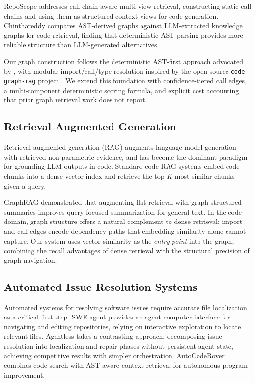 RepoScope \citep{reposcope2025} addresses call chain-aware multi-view retrieval, constructing static call chains and using them as structured context views for code generation. Chinthareddy \citep{reliablegraphrag2026} compares AST-derived graphs against LLM-extracted knowledge graphs for code retrieval, finding that deterministic AST parsing provides more reliable structure than LLM-generated alternatives.

Our graph construction follows the deterministic AST-first approach advocated by \citet{reliablegraphrag2026}, with modular import/call/type resolution inspired by the open-source \texttt{code-graph-rag} project \citep{codegraphrag}. We extend this foundation with confidence-tiered call edges, a multi-component deterministic scoring formula, and explicit cost accounting that prior graph retrieval work does not report.

\subsection{Retrieval-Augmented Generation}
\label{sec:rw_rag}

Retrieval-augmented generation (RAG) \citep{lewis2020rag} augments language model generation with retrieved non-parametric evidence, and has become the dominant paradigm for grounding LLM outputs in code. Standard code RAG systems embed code chunks into a dense vector index and retrieve the top-$K$ most similar chunks given a query.

GraphRAG \citep{edge2024graphrag} demonstrated that augmenting flat retrieval with graph-structured summaries improves query-focused summarization for general text. In the code domain, graph structure offers a natural complement to dense retrieval: import and call edges encode dependency paths that embedding similarity alone cannot capture. Our system uses vector similarity as the \emph{entry point} into the graph, combining the recall advantages of dense retrieval with the structural precision of graph navigation.

\subsection{Automated Issue Resolution Systems}
\label{sec:rw_issue_resolution}

Automated systems for resolving software issues require accurate file localization as a critical first step. SWE-agent \citep{yang2024sweagent} provides an agent-computer interface for navigating and editing repositories, relying on interactive exploration to locate relevant files. Agentless \citep{xia2024agentless} takes a contrasting approach, decomposing issue resolution into localization and repair phases without persistent agent state, achieving competitive results with simpler orchestration. AutoCodeRover \citep{zhang2024autocoderover} combines code search with AST-aware context retrieval for autonomous program improvement.

